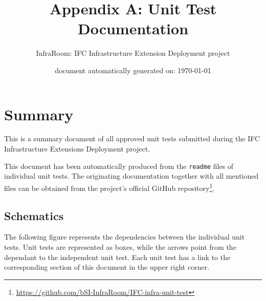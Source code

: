 \documentclass{scrartcl}
\title{Appendix A: Unit Test Documentation}
\author{InfraRoom: IFC Infrastructure Extension Deployment project}
\date{document automatically generated on: \today}
\begin{document}
\maketitle

\section{Summary}
\label{sec:summary}

This is a summary document of all approved unit tests submitted during the IFC Infrastructure Extensions Deployment project.

This document has been automatically produced from the \texttt{readme} files of individual unit tests.
The originating documentation together with all mentioned files can be obtained
 from the project's official GitHub repository\footnote{\url{https://github.com/bSI-InfraRoom/IFC-infra-unit-test}}.

\subsection{Schematics}
\label{sec:schematics}

The following figure represents the dependencies between the individual unit tests.
Unit tests are represented as boxes, while the arrows point from the dependant to the independent unit test.
Each unit test has a link to the corresponding section of this document in the upper right corner.
\end{document}

